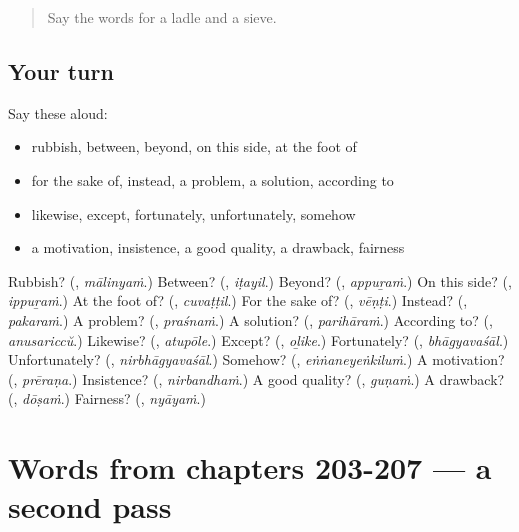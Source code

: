 \label{lesson:ML-R207-first-pass-words-from-chapters-199-202}



\begin{quote}
Say the words for a ladle and a sieve.
\end{quote}

\subsection*{Your turn}
Say these aloud:

\begin{itemize}
\raggedright
  \item rubbish, between, beyond, on this side, at the foot of
  \item for the sake of, instead, a problem, a solution, according to
  \item likewise, except, fortunately, unfortunately, somehow
  \item a motivation, insistence, a good quality, a drawback, fairness
\end{itemize}

\begin{tcolorbox}[breakable,colback=teal!4,colframe=teal!35!black,title={Before you move on}]
Rubbish? (\textbf{}, \emph{mālinyaṁ}.) Between? (\textbf{}, \emph{iṭayil}.) Beyond? (\textbf{}, \emph{appuṟaṁ}.) On this side? (\textbf{}, \emph{ippuṟaṁ}.) At the foot of? (\textbf{}, \emph{cuvaṭṭil}.) For the sake of? (\textbf{}, \emph{vēṇṭi}.) Instead? (\textbf{}, \emph{pakaraṁ}.) A problem? (\textbf{}, \emph{praśnaṁ}.) A solution? (\textbf{}, \emph{parihāraṁ}.) According to? (\textbf{}, \emph{anusariccŭ}.) Likewise? (\textbf{}, \emph{atupōle}.) Except? (\textbf{}, \emph{oḻike}.) Fortunately? (\textbf{}, \emph{bhāgyavaśāl}.) Unfortunately? (\textbf{}, \emph{nirbhāgyavaśāl}.) Somehow? (\textbf{}, \emph{eṅṅaneyeṅkiluṁ}.) A motivation? (\textbf{}, \emph{prēraṇa}.) Insistence? (\textbf{}, \emph{nirbandhaṁ}.) A good quality? (\textbf{}, \emph{guṇaṁ}.) A drawback? (\textbf{}, \emph{dōṣaṁ}.) Fairness? (\textbf{}, \emph{nyāyaṁ}.)
\end{tcolorbox}
\section[(dialogue)]{Words from chapters 203-207 — a second pass}

